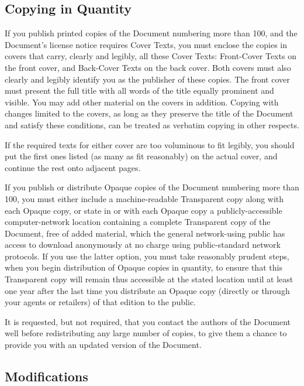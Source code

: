 	\subsection{Copying in Quantity}

	If you publish printed copies of the Document numbering more than 100, and the Document's license notice requires Cover Texts, you must enclose the copies in covers that carry, clearly and legibly, all these Cover Texts: Front-Cover Texts on the front cover, and Back-Cover Texts on the back cover. Both covers must also clearly and legibly identify you as the publisher of these copies. The front cover must present the full title with all words of the title equally prominent and visible. You may add other material on the covers in addition. Copying with changes limited to the covers, as long as they preserve the title of the Document and satisfy these conditions, can be treated as verbatim copying in other respects. 

	If the required texts for either cover are too voluminous to fit legibly, you should put the first ones listed (as many as fit reasonably) on the actual cover, and continue the rest onto adjacent pages. 

	If you publish or distribute Opaque copies of the Document numbering more than 100, you must either include a machine-readable Transparent copy along with each Opaque copy, or state in or with each Opaque copy a publicly-accessible computer-network location containing a complete Transparent copy of the Document, free of added material, which the general network-using public has access to download anonymously at no charge using public-standard network protocols. If you use the latter option, you must take reasonably prudent steps, when you begin distribution of Opaque copies in quantity, to ensure that this Transparent copy will remain thus accessible at the stated location until at least one year after the last time you distribute an Opaque copy (directly or through your agents or retailers) of that edition to the public. 

	It is requested, but not required, that you contact the authors of the Document well before redistributing any large number of copies, to give them a chance to provide you with an updated version of the Document. 

	\subsection{Modifications}

